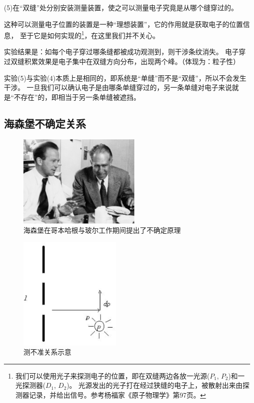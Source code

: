 (5)在``双缝''处分别安装测量装置，使之可以测量电子究竟是从哪个缝穿过的。

这种可以测量电子位置的装置是一种``理想装置''，它的作用就是获取电子的位置信息，
至于它是如何实现的\footnote{我们可以使用光子来探测电子的位置，即在双缝两边各放一光源($P_1$, $P_2$)和一光探测器($D_1$, $D_2$)。
光源发出的光子打在经过狭缝的电子上，被散射出来由探测器记录，并给出信号。参考杨福家《原子物理学》第97页。}，在这里我们并不关心。

实验结果是：如每个电子穿过哪条缝都被成功观测到，则干涉条纹消失。
电子穿过双缝积累效果是电子集中在双缝方向分布，出现两个峰。（体现为：粒子性）

实验(5)与实验(4)本质上是相同的，即系统是``单缝''而不是``双缝''，所以不会发生干涉。
一旦我们可以确认电子是由哪条单缝穿过的，另一条单缝对电子来说就是``不存在''的，即相当于另一条单缝被遮挡。

\subsection{海森堡不确定关系}

\begin{figure}[h]
\begin{center}
\includegraphics[clip,width=6cm]{Duality/bohr-hei.ps}
\caption{海森堡在哥本哈根与玻尔工作期间提出了不确定原理}
\end{center}
\end{figure}


\begin{figure}[ht]
\begin{center}
\includegraphics[clip,width=5cm]{Duality/5-7.ps}
\caption{测不准关系示意}\label{5-7-ps}
\end{center}
\end{figure}


